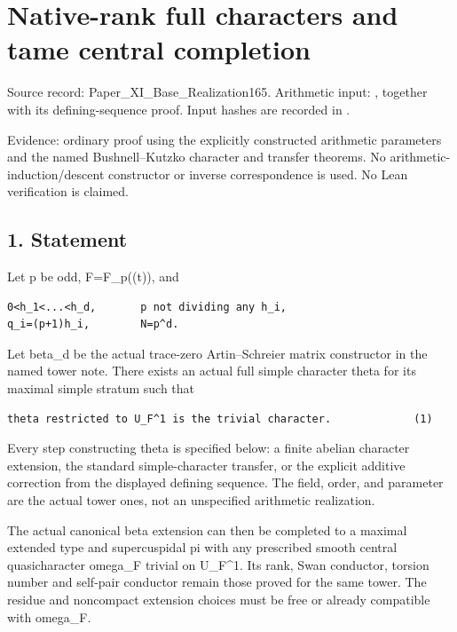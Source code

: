 \clearpage
\section{Native-rank full characters and tame central completion}\label{app:odd_character}

Source record: Paper\_XI\_Base\_Realization165. Arithmetic
input: ,
together with its  defining-sequence
proof. Input hashes are recorded in
.

Evidence: ordinary proof using the explicitly constructed arithmetic
parameters and the named Bushnell--Kutzko character and transfer
theorems. No arithmetic-induction/descent constructor or inverse
correspondence is used. No Lean verification is claimed.

\hypertarget{odd_character-statement}{%
\subsection{1. Statement}\label{odd_character-statement}}

Let p be odd, F=F\_p((t)), and

\begin{Verbatim}[fontsize=\small,breaklines=true,breakanywhere=true]
0<h_1<...<h_d,       p not dividing any h_i,
q_i=(p+1)h_i,        N=p^d.
\end{Verbatim}

Let beta\_d be the actual trace-zero Artin--Schreier matrix constructor
in the named tower note. There exists an actual full simple character
theta for its maximal simple stratum such that

\begin{Verbatim}[fontsize=\small,breaklines=true,breakanywhere=true]
theta restricted to U_F^1 is the trivial character.             (1)
\end{Verbatim}

Every step constructing theta is specified below: a finite abelian
character extension, the standard simple-character transfer, or the
explicit additive correction from the displayed defining sequence. The
field, order, and parameter are the actual tower ones, not an
unspecified arithmetic realization.

The actual canonical beta extension can then be completed to a maximal
extended type and supercuspidal pi with any prescribed smooth central
quasicharacter omega\_F trivial on U\_F\^{}1. Its rank, Swan conductor,
torsion number and self-pair conductor remain those proved for the same
tower. The residue and noncompact extension choices must be free or
already compatible with omega\_F.


